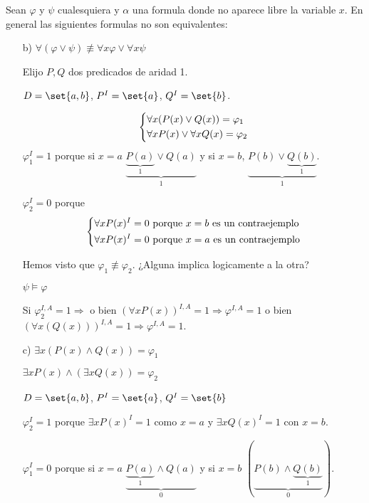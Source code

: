 \begin{example}
	Sean \(\varphi\) y \(\psi \) cualesquiera y \(\alpha\) una formula donde no aparece libre la variable \(x \). En general las siguientes formulas no son equivalentes:
	\begin{enumerate}
		\item[b)] \(\forall (\varphi \vee \psi) \not\equiv \forall x \varphi \vee \forall  x \psi\)

			Elijo \(P,Q \) dos predicados de aridad 1.

			\(D = \set{a,b }\), \(P^{I} = \set{a} \), \(Q^{I} = \set{b} \).

			\[
				\begin{dcases}
					\forall x (P(x) \vee Q(x)) = \varphi_1 \\
					\forall x P(x) \vee \forall  x Q(x) = \varphi_2
				\end{dcases}
			\]
			\(\varphi^{I}_1 = 1 \) porque si \(x = a \) \(\underbrace{\underbrace{P(a)}_1 \vee Q(a)}_1\) y si \(x = b \),
			\(\underbrace{P(b) \vee \underbrace{Q(b)}_1}_1\).

			\(\varphi^{I}_2 = 0 \) porque
			\[
				\begin{dcases}
					\forall x P(x)^{I} = 0 \text{ porque } x = b \text{ es un contraejemplo} \\
					\forall x P(x)^{I} = 0 \text{ porque } x = a \text{ es un contraejemplo}
				\end{dcases}
			\]

			Hemos visto que \(\varphi_1 \not\equiv \varphi_2 \). ¿Alguna implica logicamente a la otra?

			\(\psi \vDash \varphi\)

			Si \(\varphi_2^{I,A} = 1 \Rightarrow \) o bien \((\forall x P(x))^{I,A} = 1 \Rightarrow \varphi^{I,A} = 1  \) o bien \((\forall  x (Q(x)))^{I,A} = 1 \Rightarrow \varphi^{I,A} = 1 \).

		\item[c)] \(\exists  x (P(x) \wedge  Q(x)) = \varphi_1 \)

			\(\exists  x P(x) \wedge (\exists x Q(x)) = \varphi_2 \)

			\(D = \set{a,b }\), \(P^{I} = \set{a} \), \(Q^{I} = \set{b} \)

			\(\varphi^{I}_2 = 1 \) porque \(\exists  x P(x)^{I}  = 1 \) como \(x = a \) y \(\exists  x Q(x)^{I} = 1  \) con \(x = b \).

			\(\varphi^{I}_1 = 0 \) porque si \(x = a \) \(\underbrace{\underbrace{P(a)}_1 \wedge Q(a)}_0\) y si \(x = b \) \((\underbrace{P(b) \wedge \underbrace{Q(b)}_1}_0)\).


\end{enumerate}
\end{example}
